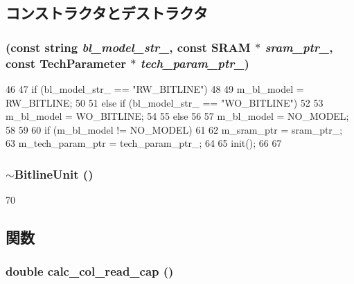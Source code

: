 \subsection{コンストラクタとデストラクタ}
\hypertarget{classBitlineUnit_a5c6a683eb8adcc3e9234c773a667b49e}{
\subsubsection[{BitlineUnit}]{ (const string {\em bl\_\-model\_\-str\_\-}, \/  const {\bf SRAM} $\ast$ {\em sram\_\-ptr\_\-}, \/  const {\bf TechParameter} $\ast$ {\em tech\_\-param\_\-ptr\_\-})}}
\label{classBitlineUnit_a5c6a683eb8adcc3e9234c773a667b49e}



\begin{DoxyCode}
46 {
47     if (bl_model_str_ == "RW_BITLINE")
48     {
49         m_bl_model = RW_BITLINE;
50     }
51     else if (bl_model_str_ == "WO_BITLINE")
52     {
53         m_bl_model = WO_BITLINE;
54     }
55     else 
56     {
57         m_bl_model = NO_MODEL;
58     }
59 
60     if (m_bl_model != NO_MODEL)
61     {
62         m_sram_ptr = sram_ptr_;
63         m_tech_param_ptr = tech_param_ptr_;
64 
65         init();
66     }
67 }
\end{DoxyCode}
\hypertarget{classBitlineUnit_a562ef5642fe773aee1454bba8b5fefc0}{
\subsubsection[{$\sim$BitlineUnit}]{\setlength{\rightskip}{0pt plus 5cm}$\sim${\bf BitlineUnit} ()}}
\label{classBitlineUnit_a562ef5642fe773aee1454bba8b5fefc0}



\begin{DoxyCode}
70 {}
\end{DoxyCode}


\subsection{関数}
\hypertarget{classBitlineUnit_a8392bae5acfef90c8eb970571f97fa73}{
\subsubsection[{calc\_\-col\_\-read\_\-cap}]{\setlength{\rightskip}{0pt plus 5cm}double calc\_\-col\_\-read\_\-cap ()}}
\label{classBitlineUnit_a8392bae5acfef90c8eb970571f97fa73}




